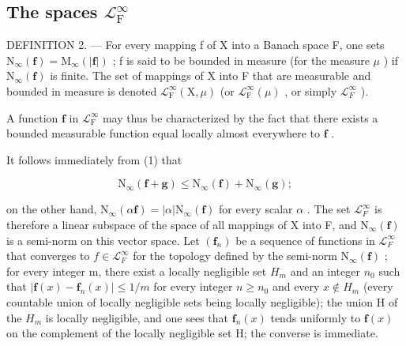 \subsection{\texorpdfstring{The spaces \(\mathcal{L}_{\mathrm{F}}^{\infty}\)}{The spaces L sub F to infinity}}

DEFINITION 2. --- For every mapping f of X into a Banach space F, one sets \(\mathrm{N}_{\infty}(\mathbf{f}) = \mathrm{M}_{\infty}(|\mathbf{f}|)\) ; f is said to be bounded in measure (for the measure \(\mu\) ) if \(\mathrm{N}_{\infty}(\mathbf{f})\) is finite. The set of mappings of X into F that are measurable and bounded in measure is denoted \(\mathcal{L}_{\mathrm{F}}^{\infty}(\mathrm{X}, \mu)\) (or \(\mathcal{L}_{\mathrm{F}}^{\infty}(\mu)\) , or simply \(\mathcal{L}_{F}^{\infty}\) ).

A function \(\mathbf{f}\) in \(\mathcal{L}_{\mathrm{F}}^{\infty}\) may thus be characterized by the fact that there exists a bounded measurable function equal locally almost everywhere to \(\mathbf{f}\) .

It follows immediately from (1) that

\[
\mathrm{N} _ {\infty} (\mathbf {f} + \mathbf {g}) \leqslant \mathrm{N} _ {\infty} (\mathbf {f}) + \mathrm{N} _ {\infty} (\mathbf {g});
\]

on the other hand, \(\mathrm{N}_{\infty}(\alpha\mathbf{f}) = |\alpha| \mathrm{N}_{\infty}(\mathbf{f})\) for every scalar \(\alpha\) . The set \(\mathcal{L}_{F}^{\infty}\) is therefore a linear subspace of the space of all mappings of X into F, and \(\mathrm{N}_{\infty}(\mathbf{f})\) is a semi-norm on this vector space. Let \((\mathbf{f}_{n})\) be a sequence of functions in \(\mathcal{L}_{F}^{\infty}\) that converges to \(f \in \mathcal{L}_{F}^{\infty}\) for the topology defined by the semi-norm \(\mathrm{N}_{\infty}(\mathbf{f})\) ; for every integer m, there exist a locally negligible set \(H_{m}\) and an integer \(n_{0}\) such that \(|\mathbf{f}(x) - \mathbf{f}_{n}(x)| \leqslant 1/m\) for every integer \(n \geqslant n_{0}\) and every \(x \notin H_{m}\) (every countable union of locally negligible sets being locally negligible); the union H of the \(H_{m}\) is locally negligible, and one sees that \(\mathbf{f}_{n}(x)\) tends uniformly to \(\mathbf{f}(x)\) on the complement of the locally negligible set H; the converse is immediate.

